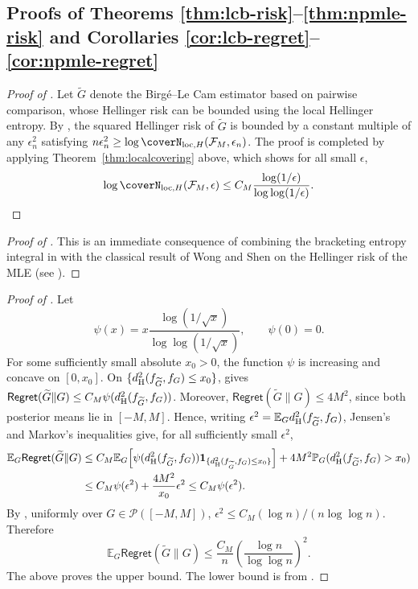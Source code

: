 \documentclass[letterpaper,11pt]{article}
\newcommand{\Expect}{\mathbb{E}}
\newcommand{\Prob}{\mathbb{P}}
\newcommand{\hellinger}{d_{\rm H}}
\newcommand{\calF}{{\mathcal{F}}}
\theoremstyle{definition}
\newcommand{\Regret}{\mathsf{Regret}}
\renewcommand{\tilde}{\widetilde}
\begin{document}
\subsection{Proofs of Theorems \ref{thm:lcb-risk}--\ref{thm:npmle-risk} and Corollaries \ref{cor:lcb-regret}--\ref{cor:npmle-regret}}
\label{sec:remaining-proof}

\begin{proof}[Proof of ]
Let $\tilde G$ denote the Birg\'e--Le Cam estimator based on pairwise comparison, whose Hellinger risk can be bounded using the local Hellinger entropy.
By \cite[Theorem~32.10]{polyanskiy.wu.2025}, the squared Hellinger risk of $\tilde G$ is bounded by a constant multiple of any
$\epsilon_n^2$ satisfying
$
n\epsilon_n^2
\ge
\log \coverN_{\mathrm{loc},H}(\calF_M,\epsilon_n)$.
The proof is completed by applying Theorem~\ref{thm:localcovering} above, which shows for all small
$\epsilon$,
\[
\log \coverN_{\mathrm{loc},H}(\calF_M,\epsilon)
\le
C_M\frac{\log(1/\epsilon)}{\log\log(1/\epsilon)}. \qedhere
\]
\end{proof}


\begin{proof}[Proof of ]
This is an immediate consequence of combining the bracketing entropy integral in
 with the classical result of Wong and
Shen on the Hellinger risk of the MLE (see \cite[Theorem~2 and Remark~(ii) thereafter]{wong.shen.1995}).
\end{proof}



\begin{proof}[Proof of ]
Let
\[
\psi(x)=x\frac{\log(1/\sqrt{x})}{\log\log(1/\sqrt{x})},
\qquad \psi(0)=0.
\]
For some sufficiently small absolute $x_0>0$, the function $\psi$ is
increasing and concave on $[0,x_0]$.   On $\{\hellinger^2(f_{\tilde G}, f_G)\le
x_0\}$,
 gives
$\Regret(\tilde G\|G)\le C_M\psi(\hellinger^2(f_{\tilde G}, f_G))$.  Moreover,
$\Regret(\tilde G\|G)\le4M^2$, since both posterior means lie in
$[-M,M]$.  Hence, writing $\epsilon^2=\Expect_G \hellinger^2(f_{\tilde G}, f_G) $,
Jensen's and Markov's
inequalities give, for all sufficiently small $\epsilon^2$,
\[
\begin{aligned}
\Expect_G\Regret(\tilde G\|G)
&\le
C_M\Expect_G\!\left[\psi(\hellinger^2(f_{\tilde G}, f_G))\mathbf 1_{\{\hellinger^2(f_{\tilde G}, f_G)\le x_0\}}\right]
+4M^2\Prob_G(\hellinger^2(f_{\tilde G}, f_G)>x_0)\\
&\le C_M\psi(\epsilon^2)+\frac{4M^2}{x_0} \epsilon^2
\le C_M\psi(\epsilon^2).
\end{aligned}
\]
By , uniformly over
$G\in\mathcal P([-M,M])$,
$\epsilon^2\le C_M(\log n)/(n\log\log n)$.  Therefore
\[
\Expect_G\Regret(\tilde G\|G)
\le
\frac{C_M}{n}
\left(\frac{\log n}{\log\log n}\right)^2. 
\]
The above proves the upper bound.
The lower bound is from \cite{polyanskiy2021sharp}. \qedhere
\end{proof}
\end{document}
